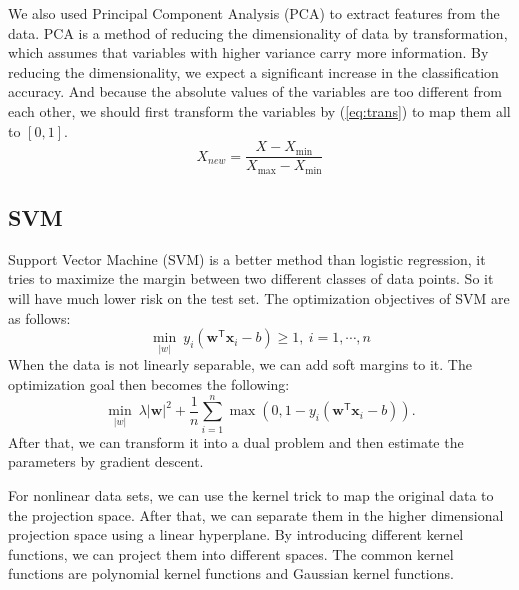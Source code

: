 \documentclass[11pt, a4paper, jou]{apa7}
\begin{document}
    We also used Principal Component Analysis (PCA)\cite{Pearson1901} to extract features from the data. PCA is a method of reducing the dimensionality of data by transformation, which assumes that variables with higher variance carry more information. By reducing the dimensionality, we expect a significant increase in the classification accuracy. And because the absolute values of the variables are too different from each other, we should first transform the variables by (\ref{eq:trans}) to map them all to $[0,1]$. 
    \begin{equation}
        \label{eq:trans}
        X_{new} = \frac{X - X_{\min}}{X_{\max}- X_{\min}}
    \end{equation}
\subsection{SVM}
    Support Vector Machine (SVM) is a better method than logistic regression, it tries to maximize the margin between two different classes of data points. So it will have much lower risk on the test set. The optimization objectives of SVM are as follows: 
    \begin{equation}
        \min_{|w|}\ y_{i}(\mathbf {w} ^{\mathsf {T}}\mathbf {x} _{i}-b)\geq 1,\ i=1, \cdots, n
    \end{equation}
    When the data is not linearly separable, we can add soft margins to it. The optimization goal then becomes the following: 
    \begin{equation}
        \min_{|w|}\ \lambda |\mathbf {w}| ^{2}+{\frac {1}{n}}\sum _{i=1}^{n}\max \left(0,1-y_{i}(\mathbf {w} ^{\mathsf {T}}\mathbf {x} _{i}-b)\right). 
    \end{equation}
    After that, we can transform it into a dual problem and then estimate the parameters by gradient descent. 

    For nonlinear data sets, we can use the kernel trick to map the original data to the projection space. After that, we can separate them in the higher dimensional projection space using a linear hyperplane. By introducing different kernel functions, we can project them into different spaces. The common kernel functions are polynomial kernel functions and Gaussian kernel functions. 
\end{document}
